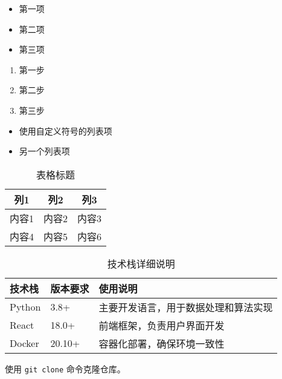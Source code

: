 
\begin{itemize}
    \item 第一项
    \item 第二项
    \item 第三项
\end{itemize}

\begin{enumerate}
    \item 第一步
    \item 第二步
    \item 第三步
\end{enumerate}

\begin{itemize}[label=\textbullet]
    \item 使用自定义符号的列表项
    \item 另一个列表项
\end{itemize}

\begin{table}[H]
\centering
\begin{tabular}{|c|c|c|}
\hline
\textbf{列1} & \textbf{列2} & \textbf{列3} \\
\hline
内容1 & 内容2 & 内容3 \\
\hline
内容4 & 内容5 & 内容6 \\
\hline
\end{tabular}
\caption{表格标题}
\label{tab:example}
\end{table}

\begin{table}[H]
\centering
\begin{tabular}{|p{3cm}|p{4cm}|p{6cm}|}
\hline
\textbf{技术栈} & \textbf{版本要求} & \textbf{使用说明} \\
\hline
Python & 3.8+ & 主要开发语言，用于数据处理和算法实现 \\
\hline
React & 18.0+ & 前端框架，负责用户界面开发 \\
\hline
Docker & 20.10+ & 容器化部署，确保环境一致性 \\
\hline
\end{tabular}
\caption{技术栈详细说明}
\end{table}

使用 \texttt{git clone} 命令克隆仓库。

